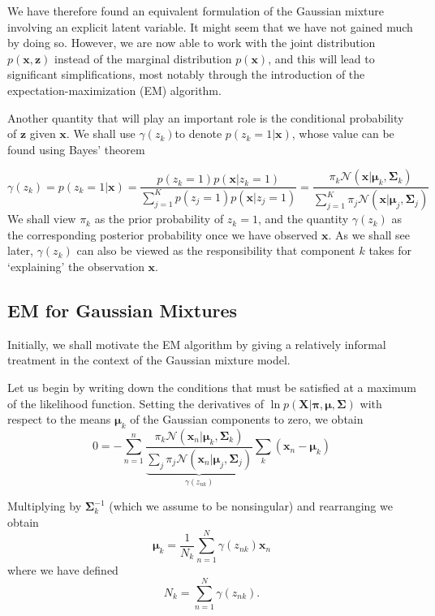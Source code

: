 ﻿\documentclass[a4paper, 11pt]{article}
\numberwithin{equation}{subsection}
\begin{document}
We have therefore found an equivalent formulation of the Gaussian mixture involving an explicit latent variable. It might seem that we have not gained much by doing so. However, we are now able to work with the joint distribution $p(\mathbf x, \mathbf z)$ instead of the marginal distribution $p(\mathbf x)$, and this will lead to significant simplifications, most notably through the introduction of the expectation-maximization (EM) algorithm.

Another quantity that will play an important role is the conditional probability of $\mathbf z$ given $\mathbf x$. We shall use $\gamma(z_k)$to denote $p(z_k=1|\mathbf x)$, whose value can be found using Bayes’ theorem

\begin{equation}
\gamma(z_k)=p(z_k=1|\mathbf x)=\frac{p(z_k=1)p(\mathbf x|z_k=1)}{\sum_{j=1}^Kp(z_j=1)p(\mathbf x|z_j=1)}=\frac{\pi_k\mathcal N(\mathbf x|\boldsymbol\mu_k,\boldsymbol\Sigma_k)}{\sum_{j=1}^K\pi_j\mathcal N(\mathbf x|\boldsymbol\mu_j,\boldsymbol\Sigma_j)}
\end{equation}
We shall view $\pi_k$ as the prior probability of $z_k=1$, and the quantity $\gamma(z_k)$ as the corresponding posterior probability once we have observed $\mathbf x$. As we shall see later, $\gamma(z_k)$ can also be viewed as the responsibility that component $k$ takes for ‘explaining’ the observation $\mathbf x$.




\subsection{EM for Gaussian Mixtures}
Initially, we shall motivate the EM algorithm by giving a relatively informal treatment in the context of the Gaussian mixture model.

Let us begin by writing down the conditions that must be satisfied at a maximum of the likelihood function. Setting the derivatives of $\ln p(\mathbf X|\boldsymbol\pi,\boldsymbol\mu,\boldsymbol\Sigma)$ with respect to the means $\boldsymbol\mu_k$ of the Gaussian components to zero, we obtain
\begin{equation}
0=-\sum_{n=1}^n\frac{\pi_k\mathcal N(\mathbf x_n|\boldsymbol\mu_k,\boldsymbol\Sigma_k)}{\underbrace{\sum_j\pi_j\mathcal N(\mathbf x_n|\boldsymbol\mu_j,\boldsymbol\Sigma_j)}_{\gamma(z_{nk})}}\sum_k(\mathbf x_n-\boldsymbol\mu_k)
\end{equation}

Multiplying by $\boldsymbol\Sigma_k^{-1}$ (which we assume to be nonsingular) and rearranging we obtain
\begin{equation}
\boldsymbol\mu_k=\frac{1}{N_k}\sum_{n=1}^N\gamma(z_{nk})\mathbf x_n
\end{equation}
where we have defined
\begin{equation}
 N_k=\sum_{n=1}^N\gamma(z_{nk}).
  \end{equation} 
\end{document}
